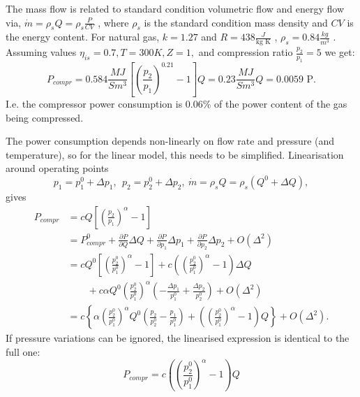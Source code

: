 \documentclass[12pt]{article}
\begin{document}
The mass flow is related to standard condition volumetric flow and energy flow via,  \( \dot{m}= \rho _{s}Q= \rho _{s}\frac{P}{CV} \) , where  \(  \rho _{s} \)  is the standard condition mass density and  \( CV \)  is the energy content. For natural gas,  \( k=1.27 \)  and  \( R=438\frac{J}{\text{kg K}} \) ,  \(  \rho _{s}=0.84\frac{kg}{m^{3}} \) . Assuming values  \(  \eta _{is}=0.7, T=300 K, Z=1, \)  and compression ratio  \( \frac{p_{2}}{p_{1}}=5  \) we get:
\begin{equation}
	P_{compr}
	=0.584 \frac{MJ}{Sm^{3}} \left[  \left( \frac{p_{2}}{p_{1}} \right) ^{0.21}-1 \right] Q
	=0.23\frac{MJ}{Sm^{3}} Q=\text{0.0059 P}. 
\end{equation} 
I.e. the compressor power consumption is 0.06$\%$  of the power content of the gas being compressed.


The power consumption depends non-linearly on flow rate and pressure (and temperature), so for the linear model, this needs to be simplified. Linearisation around operating points
\begin{equation}
	 p_{1}=p_{1}^{0}+ \Delta p_{1},~~p_{2}=p_{2}^{0}+ \Delta p_{2},~\dot{m}= \rho _{s}Q= \rho _{s} \left( Q^{0}+ \Delta Q \right) ,
\end{equation} 
gives
\begin{equation}
 \begin{split}
 P_{compr} & 
 	=c Q \left[  \left( \frac{p_{2}}{p_{1}} \right) ^{ \alpha }-1 \right] 
 \\ &
	=P_{compr}^{0}+\frac{ \partial P}{ \partial Q} \Delta Q+\frac{ \partial P}{ \partial p_{1}} \Delta p_{1}+\frac{ \partial P}{ \partial p_{2}} \Delta p_{2}+O \left(  \Delta ^{2} \right)  
 \\ & 
	=c Q^{0} \left[  \left( \frac{p_{2}^{0}}{p_{1}^{0}} \right) ^{ \alpha }-1 \right] +c \left(  \left( \frac{p_{2}^{0}}{p_{1}^{0}} \right) ^{ \alpha }-1 \right)  \Delta Q
	\\& \qquad +c \alpha Q^{0} \left( \frac{p_{2}^{0}}{p_{1}^{0}} \right) ^{ \alpha } \left( -\frac{ \Delta p_{1}}{p_{1}^{0}}+\frac{ \Delta p_{2}}{p_{2}^{0}} \right) +O \left(  \Delta ^{2} \right)  
 \\ & 
	=c  \left\{  \alpha  \left( \frac{p_{2}^{0}}{p_{1}^{0}} \right) ^{ \alpha }Q^{0} 
 	\left( \frac{p_{2}}{p_{2}^{0}}-\frac{p_{1}}{p_{1}^{0}} \right) 
 	+ \left(  \left( \frac{p_{2}^{0}}{p_{1}^{0}} \right) ^{ \alpha }-1 \right) Q \right\} 
 +O \left(  \Delta ^{2} \right) . 
 \end{split}
 \end{equation}
%
If pressure variations can be ignored, the linearised expression is identical to the full one:
\begin{equation}
	P_{compr}=c  \left(  \left( \frac{p_{2}^{0}}{p_{1}^{0}} \right) ^{ \alpha }-1 \right) Q
\end{equation}
\end{document}

